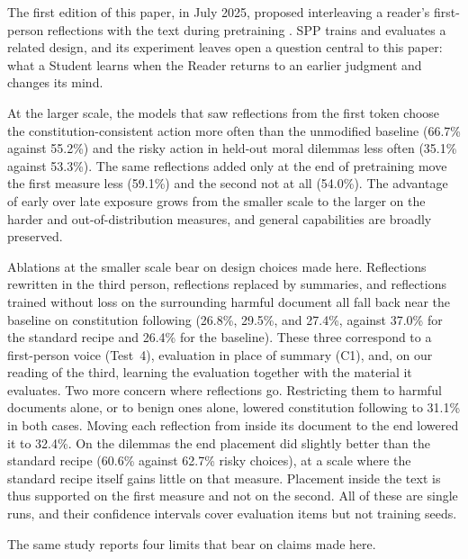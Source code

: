 \documentclass[11pt]{article}
\begin{document}
The first edition of this paper, in July 2025, proposed interleaving a reader's
first-person reflections with the text during pretraining
\cite{westerberg2025superintelligence}. SPP trains and evaluates a related
design, and its experiment leaves open a question central to this paper: what a
Student learns when the Reader returns to an earlier judgment and changes its
mind.

At the larger scale, the models
that saw reflections from the first token choose the constitution-consistent
action more often than the unmodified baseline (66.7\% against 55.2\%) and the
risky action in held-out moral dilemmas less often (35.1\% against 53.3\%). The
same reflections added only at the end of pretraining move the first measure
less (59.1\%) and the second not at all (54.0\%). The advantage of early over
late exposure grows from the smaller scale to the larger on the harder and
out-of-distribution measures, and general capabilities are broadly preserved.

Ablations at the smaller scale bear on design choices made here. Reflections
rewritten in the third person, reflections replaced by summaries, and
reflections trained without loss on the surrounding harmful document all fall
back near the baseline on constitution following (26.8\%, 29.5\%, and 27.4\%,
against 37.0\% for the standard recipe and 26.4\% for the baseline). These
three correspond to a first-person voice (Test~4), evaluation in place of
summary (C1), and, on our reading of the third, learning the evaluation
together with the material it evaluates. Two more concern where reflections
go. Restricting them to harmful documents alone, or to benign ones alone,
lowered constitution following to 31.1\% in both cases. Moving each reflection
from inside its document to the end lowered it to 32.4\%. On the dilemmas the
end placement did slightly better than the standard recipe (60.6\% against
62.7\% risky choices), at a scale where the standard recipe itself gains
little on that measure. Placement inside the text is thus supported on the
first measure and not on the second. All of these are single runs, and their
confidence intervals cover evaluation items but not training seeds.

The same study reports four limits that bear on claims made here.
\end{document}
